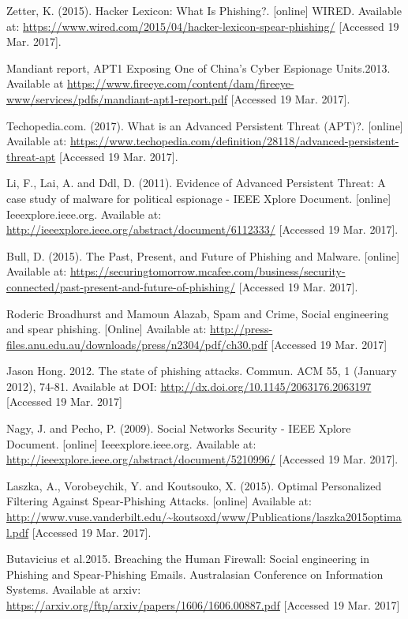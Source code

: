 \documentclass[12pt]{article} %
\begin{document}
\begin{thebibliography}{99}
 Zetter, K. (2015). Hacker Lexicon: What Is Phishing?. [online] WIRED. Available at: \url{https://www.wired.com/2015/04/hacker-lexicon-spear-phishing/} [Accessed 19 Mar. 2017].


 Mandiant report, APT1 Exposing One of China's Cyber Espionage Units.2013. Available at \url{https://www.fireeye.com/content/dam/fireeye-www/services/pdfs/mandiant-apt1-report.pdf} [Accessed 19 Mar. 2017].

 Techopedia.com. (2017). What is an Advanced Persistent Threat (APT)?. [online] Available at: \url{https://www.techopedia.com/definition/28118/advanced-persistent-threat-apt} [Accessed 19 Mar. 2017].

 Li, F., Lai, A. and Ddl, D. (2011). Evidence of Advanced Persistent Threat: A case study of malware for political espionage - IEEE Xplore Document. [online] Ieeexplore.ieee.org. Available at: \url{http://ieeexplore.ieee.org/abstract/document/6112333/} [Accessed 19 Mar. 2017].

 Bull, D. (2015). The Past, Present, and Future of Phishing and Malware. [online] Available at: \url{https://securingtomorrow.mcafee.com/business/security-connected/past-present-and-future-of-phishing/} [Accessed 19 Mar. 2017].

 Roderic Broadhurst and Mamoun Alazab, Spam and Crime, Social engineering and spear phishing. [Online] Available at: \url{http://press-files.anu.edu.au/downloads/press/n2304/pdf/ch30.pdf} [Accessed 19 Mar. 2017]


 Jason Hong. 2012. The state of phishing attacks. Commun. ACM 55, 1 (January 2012), 74-81. Available at DOI: \url{http://dx.doi.org/10.1145/2063176.2063197} [Accessed 19 Mar. 2017]

 Nagy, J. and Pecho, P. (2009). Social Networks Security - IEEE Xplore Document. [online] Ieeexplore.ieee.org. Available at: \url{http://ieeexplore.ieee.org/abstract/document/5210996/} [Accessed 19 Mar. 2017].

 Laszka, A., Vorobeychik, Y. and Koutsouko, X. (2015). Optimal Personalized Filtering Against Spear-Phishing Attacks. [online] Available at: \url{http://www.vuse.vanderbilt.edu/~koutsoxd/www/Publications/laszka2015optimal.pdf} [Accessed 19 Mar. 2017].

Butavicius et al.2015. Breaching the Human Firewall: Social engineering in Phishing and Spear-Phishing Emails. Australasian Conference on Information Systems. Available at arxiv: \url{https://arxiv.org/ftp/arxiv/papers/1606/1606.00887.pdf} [Accessed 19 Mar. 2017]


\end{thebibliography}
\end{document}
